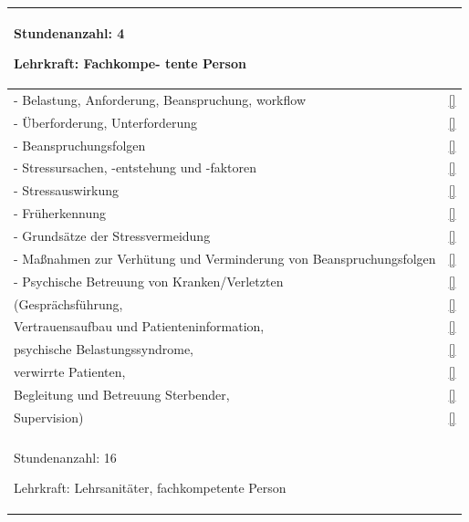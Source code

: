 \begin{xtabular}{p{10cm}p{5cm}}
\begin{inparadesc}
\item[Stundenanzahl:]  4 
\item[Lehrkraft:]  Fachkompe- tente Person
\end{inparadesc}

\\\midrule

- Belastung, Anforderung, Beanspruchung, workflow
& 
\ref{}\noindent{}
\\
- Überforderung, Unterforderung
& 
\ref{}\noindent{}
\\
- Beanspruchungsfolgen
& 
\ref{}\noindent{}
\\
- Stressursachen, -entstehung und -faktoren
& 
\ref{}\noindent{}
\\
- Stressauswirkung
& 
\ref{}\noindent{}
\\
- Früherkennung
& 
\ref{}\noindent{}
\\
- Grundsätze der Stressvermeidung
& 
\ref{}\noindent{}
\\
- Maßnahmen zur Verhütung und Verminderung von Beanspruchungsfolgen
& 
\ref{}\noindent{}
\\
- Psychische Betreuung von Kranken/Verletzten
& 
\ref{}\noindent{}
\\
(Gesprächsführung, 
& 
\ref{}\noindent{}
\\
Vertrauensaufbau und Patienteninformation, 
& 
\ref{}\noindent{}
\\
psychische Belastungssyndrome, 
& 
\ref{}\noindent{}
\\
verwirrte Patienten, 
& 
\ref{}\noindent{}
\\
Begleitung und Betreuung Sterbender, 
& 
\ref{}\noindent{}
\\
Supervision)
& 
\ref{}\noindent{}
\\
 \\\toprule
{}  



\begin{inparadesc}
\item[Stundenanzahl:] 16
\item[Lehrkraft:] Lehrsanitäter, fachkompetente Person
\end{inparadesc}

\\\midrule


\end{xtabular}
